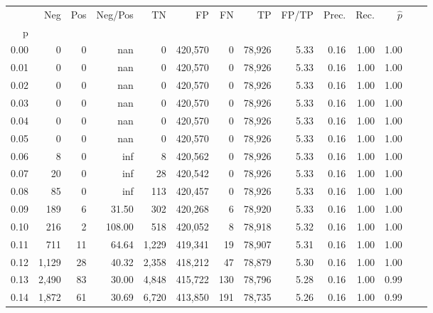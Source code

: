 \begin{tabular}{rrrrrrrrrrrrrr}
\toprule
{} &     Neg &    Pos & Neg/Pos &       TN &       FP &      FN &      TP & FP/TP & Prec. &  Rec. & $\hat{p}$ \\
p    &         &        &         &          &          &         &         &       &       &       &           \\
\midrule
0.00 &       0 &      0 &     nan &        0 &  420,570 &       0 &  78,926 &  5.33 &  0.16 &  1.00 &      1.00 \\
0.01 &       0 &      0 &     nan &        0 &  420,570 &       0 &  78,926 &  5.33 &  0.16 &  1.00 &      1.00 \\
0.02 &       0 &      0 &     nan &        0 &  420,570 &       0 &  78,926 &  5.33 &  0.16 &  1.00 &      1.00 \\
0.03 &       0 &      0 &     nan &        0 &  420,570 &       0 &  78,926 &  5.33 &  0.16 &  1.00 &      1.00 \\
0.04 &       0 &      0 &     nan &        0 &  420,570 &       0 &  78,926 &  5.33 &  0.16 &  1.00 &      1.00 \\
0.05 &       0 &      0 &     nan &        0 &  420,570 &       0 &  78,926 &  5.33 &  0.16 &  1.00 &      1.00 \\
0.06 &       8 &      0 &     inf &        8 &  420,562 &       0 &  78,926 &  5.33 &  0.16 &  1.00 &      1.00 \\
0.07 &      20 &      0 &     inf &       28 &  420,542 &       0 &  78,926 &  5.33 &  0.16 &  1.00 &      1.00 \\
0.08 &      85 &      0 &     inf &      113 &  420,457 &       0 &  78,926 &  5.33 &  0.16 &  1.00 &      1.00 \\
0.09 &     189 &      6 &   31.50 &      302 &  420,268 &       6 &  78,920 &  5.33 &  0.16 &  1.00 &      1.00 \\
0.10 &     216 &      2 &  108.00 &      518 &  420,052 &       8 &  78,918 &  5.32 &  0.16 &  1.00 &      1.00 \\
0.11 &     711 &     11 &   64.64 &    1,229 &  419,341 &      19 &  78,907 &  5.31 &  0.16 &  1.00 &      1.00 \\
0.12 &   1,129 &     28 &   40.32 &    2,358 &  418,212 &      47 &  78,879 &  5.30 &  0.16 &  1.00 &      1.00 \\
0.13 &   2,490 &     83 &   30.00 &    4,848 &  415,722 &     130 &  78,796 &  5.28 &  0.16 &  1.00 &      0.99 \\
0.14 &   1,872 &     61 &   30.69 &    6,720 &  413,850 &     191 &  78,735 &  5.26 &  0.16 &  1.00 &      0.99 \\

\end{tabular}
